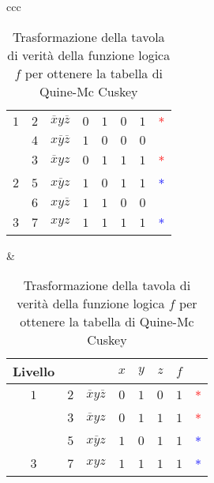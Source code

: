 \documentclass[a4paper]{extarticle}
\begin{document}
\begin{table}[H]
\begin{tabularx}{\textwidth}{ccc}
{\begin{tabular}{c|c|c|ccc|cc}
              \(1\) & $2$ & $\overline{x}y\overline{z}$ & $0$ & $1$ & $0$ & $1$ & \textcolor{red}{*}\\
              & $4$ & $x\overline{y}\overline{z}$ & $1$ & $0$ & $0$ & $0$\\
             \hline
              &
             $3$ & $\overline{x}yz$ & $0$ & $1$ & $1$ & $1$ & \textcolor{red}{*}\\
             \(2\) & $5$ & $x\overline{y}z$ & $1$ & $0$ & $1$ & $1$ & \textcolor{blue}{*}\\
             & $6$ & $xy\overline{z}$ & $1$ & $1$ & $0$ & $0$\\
             \hline
             $3$ & $7$ & $xyz$ & $1$ & $1$ & $1$ & $1$ & \textcolor{blue}{*}\\
        \end{tabular}
    }
    &
    {
        \setlength{\tabcolsep}{3.5pt}
        \begin{tabular}{c|c|c|ccc|cc}
             \textbf{Livello} & & & $x$ & $y$ & $z$ & $f$\\
             \hline
             $1$ & $2$ & $\overline{x}y\overline{z}$ & $0$ & $1$ & $0$ & $1$ & \textcolor{red}{*}\\
             \hline
             \parbox{3em}{} &
             $3$ & $\overline{x}yz$ & $0$ & $1$ & $1$ & $1$ & \textcolor{red}{*}\\
             & $5$ & $x\overline{y}z$ & $1$ & $0$ & $1$ & $1$ & \textcolor{blue}{*}\\
             \hline
             $3$ & $7$ & $xyz$ & $1$ & $1$ & $1$ & $1$ & \textcolor{blue}{*}\\
        \end{tabular}
    }
    \end{tabularx}


    \caption{Trasformazione della tavola di verità della funzione logica \(f\) per ottenere la tabella di Quine-Mc Cuskey}
    \label{tab:tavola_verita_Quine_Mc_Cuskey}
\end{table}
\end{document}
